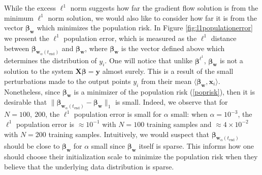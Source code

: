 \documentclass{article}
\begin{document}
While the excess $\ell^1$ norm suggests how far the gradient flow solution is from the minimum $\ell^1$ norm solution, we would also like to consider how far it is from the vector $\boldsymbol{\beta}_{\boldsymbol{w}}$ which minimizes the population risk. In Figure \ref{fig:l1populationerror} we present the $\ell^1$ population error, which is measured as the $\ell^1$ distance between $\boldsymbol{\beta}_{\boldsymbol{w}_{\alpha}(t_{\text{end}})}$ and $\boldsymbol{\beta}_{\boldsymbol{w}}$, where $\boldsymbol{\beta}_{\boldsymbol{w}}$ is the vector defined above which determines the distribution of $y_i$. One will notice that unlike $\boldsymbol{\beta}^{\ell^1}$, $\boldsymbol{\beta}_{\boldsymbol{w}}$ is not a solution to the system $\boldsymbol{X} \boldsymbol{\beta} = \boldsymbol{y}$ almost surely. This is a result of the small perturbations made to the output points $y_i$ from their mean $\langle \boldsymbol{\beta}_{\boldsymbol{w}}, \boldsymbol{x}_i \rangle$. Nonetheless, since $\boldsymbol{\beta}_{\boldsymbol{w}}$ is a minimizer of the population risk (\ref{poprisk}), then it is desirable that $\| \boldsymbol{\beta}_{\boldsymbol{w}_{\alpha}(t_{\text{end}})} - \boldsymbol{\beta}_{\boldsymbol{w}} \|_1$ is small. Indeed, we observe that for $N = 100, \ 200$, the $\ell^1$ population error is small for $\alpha$ small: when $\alpha = 10^{-3}$, the $\ell^1$ population error is $\approx 10^{-1}$ with $N=100$ training samples and $\approx 4 \times 10^{-2}$ with $N=200$ training samples. Intuitively, we would suspect that $\boldsymbol{\beta}_{\boldsymbol{w}_{\alpha}(t_{\text{end}})}$ should be close to $\boldsymbol{\beta}_{\boldsymbol{w}}$ for $\alpha$ small since $\boldsymbol{\beta}_{\boldsymbol{w}}$ itself is sparse. This informs how one should choose their initialization scale to minimize the population risk when they believe that the underlying data distribution is sparse.
\end{document}
